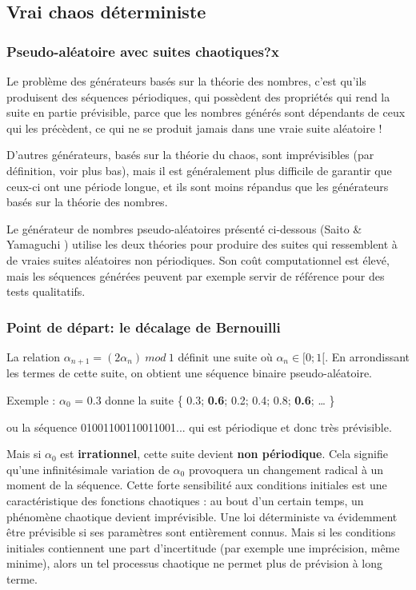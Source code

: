 \documentclass{scrartcl}
\begin{document}
\subsection{Vrai chaos déterministe}
\subsubsection{Pseudo-aléatoire avec suites chaotiques?x}
Le problème des générateurs basés sur la théorie des nombres, c’est qu’ils
produisent des séquences périodiques, qui possèdent des propriétés qui rend la
suite en partie prévisible, parce que les nombres générés sont dépendants de
ceux qui les précèdent, ce qui ne se produit jamais dans une vraie suite
aléatoire ! \par
D’autres générateurs, basés sur la théorie du chaos, sont imprévisibles (par
définition, voir plus bas), mais il est généralement plus difficile de garantir
que ceux-ci ont une période longue, et ils sont moins répandus que les
générateurs basés sur la théorie des nombres. \par
Le générateur de nombres pseudo-aléatoires présenté ci-dessous (Saito \&
Yamaguchi \cite{SY}) utilise les deux théories pour produire des suites qui
ressemblent à de vraies suites aléatoires non périodiques. Son coût
computationnel est élevé, mais les séquences générées peuvent par exemple servir
de référence pour des tests qualitatifs.

\subsubsection{Point de départ: le décalage de Bernouilli}
La relation $\alpha_{n+1}=(2\alpha_n)\ mod\ 1$ définit une suite où
$\alpha_n \in [0;1[$. En arrondissant les termes de cette suite, on obtient une
séquence binaire pseudo-aléatoire. \par
Exemple : $\alpha_0$ = 0.3 donne la suite \{ 0.3; \textbf{0.6}; 0.2; 0.4; 0.8;
\textbf{0.6}; … \} \par
ou la séquence 01001100110011001... qui est périodique et donc très
prévisible. \par
Mais si $\alpha_0$ est \textbf{irrationnel}, cette suite devient \textbf{non
  périodique}. Cela signifie qu’une infinitésimale variation de $\alpha_0$
provoquera un changement radical à un moment de la séquence. Cette forte
sensibilité aux conditions initiales est une caractéristique des fonctions
chaotiques : au bout d'un certain temps, un phénomène chaotique devient
imprévisible.  Une loi déterministe va évidemment être prévisible si ses
paramètres sont entièrement connus. Mais si les conditions initiales contiennent
une part d’incertitude (par exemple une imprécision, même minime), alors un tel
processus chaotique ne permet plus de prévision à long terme.
\end{document}
